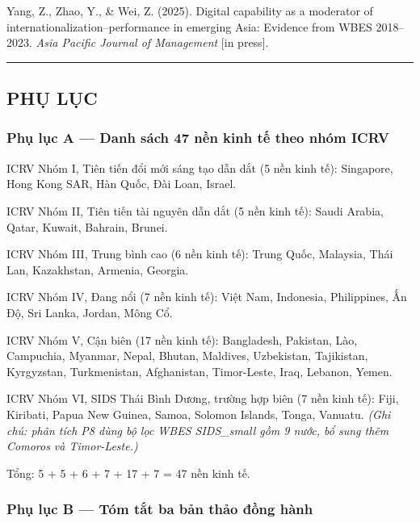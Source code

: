 \documentclass[12pt,a4paper]{article}
\begin{document}
Yang, Z., Zhao, Y., \& Wei, Z. (2025). Digital capability as a moderator
of internationalization--performance in emerging Asia: Evidence from
WBES 2018--2023. \emph{Asia Pacific Journal of Management} {[}in
press{]}.

\begin{center}\rule{0.5\linewidth}{0.5pt}\end{center}

\hypertarget{phux1ee5-lux1ee5c}{%
\subsection{PHỤ LỤC}\label{phux1ee5-lux1ee5c}}

\hypertarget{phux1ee5-lux1ee5c-a--danh-suxe1ch-47-nux1ec1n-kinh-tux1ebf-theo-nhuxf3m-icrv}{%
\subsubsection{Phụ lục A --- Danh sách 47 nền kinh tế theo nhóm
ICRV}\label{phux1ee5-lux1ee5c-a--danh-suxe1ch-47-nux1ec1n-kinh-tux1ebf-theo-nhuxf3m-icrv}}

ICRV Nhóm I, Tiên tiến đổi mới sáng tạo dẫn dắt (5 nền kinh tế):
Singapore, Hong Kong SAR, Hàn Quốc, Đài Loan, Israel.

ICRV Nhóm II, Tiên tiến tài nguyên dẫn dắt (5 nền kinh tế): Saudi
Arabia, Qatar, Kuwait, Bahrain, Brunei.

ICRV Nhóm III, Trung bình cao (6 nền kinh tế): Trung Quốc, Malaysia,
Thái Lan, Kazakhstan, Armenia, Georgia.

ICRV Nhóm IV, Đang nổi (7 nền kinh tế): Việt Nam, Indonesia,
Philippines, Ấn Độ, Sri Lanka, Jordan, Mông Cổ.

ICRV Nhóm V, Cận biên (17 nền kinh tế): Bangladesh, Pakistan, Lào,
Campuchia, Myanmar, Nepal, Bhutan, Maldives, Uzbekistan, Tajikistan,
Kyrgyzstan, Turkmenistan, Afghanistan, Timor-Leste, Iraq, Lebanon,
Yemen.

ICRV Nhóm VI, SIDS Thái Bình Dương, trường hợp biên (7 nền kinh tế):
Fiji, Kiribati, Papua New Guinea, Samoa, Solomon Islands, Tonga,
Vanuatu. \emph{(Ghi chú: phân tích P8 dùng bộ lọc WBES SIDS\_small gồm 9
nước, bổ sung thêm Comoros và Timor-Leste.)}

Tổng: 5 + 5 + 6 + 7 + 17 + 7 = 47 nền kinh tế.

\hypertarget{phux1ee5-lux1ee5c-b--tuxf3m-tux1eaft-ba-bux1ea3n-thux1ea3o-ux111ux1ed3ng-huxe0nh}{%
\subsubsection{Phụ lục B --- Tóm tắt ba bản thảo đồng
hành}\label{phux1ee5-lux1ee5c-b--tuxf3m-tux1eaft-ba-bux1ea3n-thux1ea3o-ux111ux1ed3ng-huxe0nh}}
\end{document}
